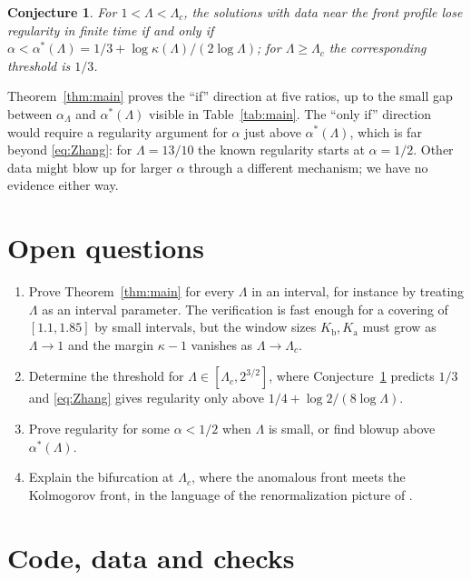 \documentclass[12pt,reqno]{amsart}
\numberwithin{equation}{section}
\theoremstyle{plain}
\newtheorem{conjecture}[theorem]{Conjecture}
\theoremstyle{definition}
\theoremstyle{remark}
\newcommand{\Kb}{K_{\mathrm b}}
\newcommand{\Ka}{K_{\mathrm a}}
\begin{document}
\begin{conjecture}\label{conj:threshold}
For $1<\Lambda<\Lambda_c$, the solutions with data near the front profile
lose regularity in finite time if and only if
$\alpha<\alpha^*(\Lambda)=1/3+\log\kappa(\Lambda)/(2\log\Lambda)$; for $\Lambda\ge\Lambda_c$ the
corresponding threshold is $1/3$.
\end{conjecture}

Theorem~\ref{thm:main} proves the ``if'' direction at five ratios, up to
the small gap between $\alpha_\Lambda$ and $\alpha^*(\Lambda)$ visible in Table~\ref{tab:main}.
The ``only if'' direction would require a regularity argument for $\alpha$
just above $\alpha^*(\Lambda)$, which is far beyond \eqref{eq:Zhang}: for $\Lambda=13/10$ the
known regularity starts at $\alpha=1/2$. Other data might blow up for
larger $\alpha$ through a different mechanism; we have no evidence either
way.

\section{Open questions}\label{sec:open}

\begin{enumerate}[label=(\arabic*)]
\item Prove Theorem~\ref{thm:main} for every $\Lambda$ in an interval, for
  instance by treating $\Lambda$ as an interval parameter. The verification
  is fast enough for a covering of $[1.1,1.85]$ by small intervals, but
  the window sizes $\Kb,\Ka$ must grow as $\Lambda\to1$ and the margin $\kappa-1$
  vanishes as $\Lambda\to\Lambda_c$.
\item Determine the threshold for $\Lambda\in[\Lambda_c,2^{3/2}]$, where
  Conjecture~\ref{conj:threshold} predicts $1/3$ and \eqref{eq:Zhang} gives
  regularity only above $1/4+\log2/(8\log\Lambda)$.
\item Prove regularity for some $\alpha<1/2$ when $\Lambda$ is small, or find
  blowup above $\alpha^*(\Lambda)$.
\item Explain the bifurcation at $\Lambda_c$, where the anomalous front meets
  the Kolmogorov front, in the language of the renormalization picture of
  \cite{Mai12,Mai13,DG98}.
\end{enumerate}

\appendix

\section{Code, data and checks}\label{app:code}
\end{document}
